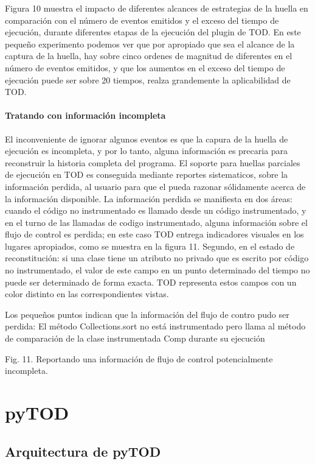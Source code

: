 \documentclass[12pt,a4paper]{report}
\begin{document}
Figura 10 muestra el impacto de diferentes alcances de estrategias de la huella en comparación con el número de eventos emitidos y el exceso del tiempo de ejecución, durante diferentes etapas de la ejecución del plugin de TOD.  En este pequeño experimento podemos ver que por apropiado que sea el alcance de la captura de la huella, hay sobre cinco ordenes de magnitud de diferentes en el número de eventos emitidos, y que los aumentos en el exceso del tiempo de ejecución puede ser sobre 20 tiempos, realza grandemente la aplicabilidad de TOD.

			\subsubsection{Tratando con información incompleta}

El inconveniente de ignorar algunos eventos es que la capura de la huella de ejecución es incompleta, y por lo tanto, alguna información es precaria para reconstruir la historia completa del programa.  El soporte para huellas parciales de ejecución en TOD es conseguida mediante reportes sistematicos, sobre la información perdida, al usuario para que el pueda razonar sólidamente acerca de la información disponible.  La información perdida se manifiesta en dos áreas: cuando el código no instrumentado es llamado desde un código instrumentado, y en el turno de las llamadas de codigo instrumentado, alguna información sobre el flujo de control es perdida; en este caso TOD entrega indicadores visuales en los lugares apropiados, como se muestra en la figura 11.  Segundo, en el estado de reconstitución: si una clase tiene un atributo no privado que es escrito por código no instrumentado, el valor de este campo en un punto determinado del tiempo no puede ser determinado de forma exacta.  TOD representa estos campos con un color distinto en las correspondientes vistas.


Los pequeños puntos indican que la información del flujo de contro pudo ser perdida: El método Collections.sort no está instrumentado pero llama al método de comparación de la clase instrumentada Comp durante su ejecución

         Fig. 11. Reportando una información de flujo de control potencialmente incompleta.


\chapter{pyTOD}
	\section{Arquitectura de pyTOD}
\end{document}
